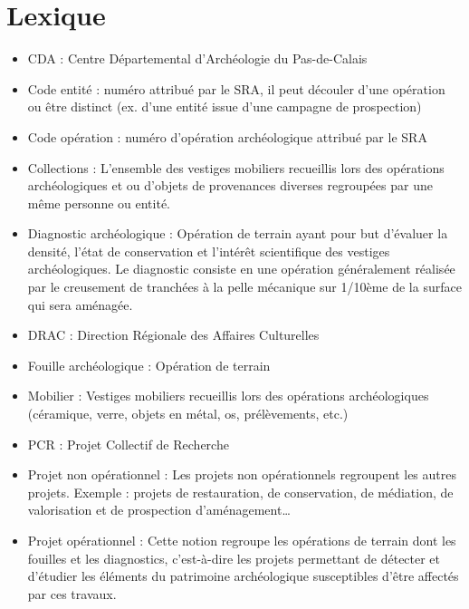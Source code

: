 \documentclass[letterpaper,10pt,french]{sphinxmanual}
\begin{document}
\chapter{Lexique}
\label{manuel/lexique:lexique}\label{manuel/lexique::doc}\begin{itemize}
\item {} 
CDA : Centre Départemental d'Archéologie du Pas-de-Calais

\item {} 
Code entité : numéro attribué par le SRA, il peut découler d'une opération ou être distinct (ex. d'une entité issue d'une campagne de prospection)

\item {} 
Code opération : numéro d’opération archéologique attribué par le SRA

\item {} 
Collections : L’ensemble des vestiges mobiliers recueillis lors des opérations archéologiques et ou d’objets de provenances diverses regroupées par une même personne ou entité.

\item {} 
Diagnostic archéologique : Opération de terrain ayant pour but d’évaluer la densité, l’état de conservation et l’intérêt scientifique des vestiges archéologiques. Le diagnostic consiste en une opération généralement réalisée par le creusement de tranchées à la pelle mécanique sur 1/10ème de la surface qui sera aménagée.

\item {} 
DRAC : Direction Régionale des Affaires Culturelles

\item {} 
Fouille archéologique : Opération de terrain

\item {} 
Mobilier : Vestiges mobiliers recueillis lors des opérations archéologiques (céramique, verre, objets en métal, os, prélèvements, etc.)

\item {} 
PCR : Projet Collectif de Recherche

\item {} 
Projet non opérationnel : Les projets non opérationnels regroupent les autres projets. Exemple : projets de restauration, de conservation, de médiation, de valorisation et de prospection d’aménagement…

\item {} 
Projet opérationnel : Cette notion regroupe les opérations de terrain dont les fouilles et les diagnostics, c’est-à-dire les projets permettant de détecter et d’étudier les éléments du patrimoine archéologique susceptibles d’être affectés par ces travaux.


\end{itemize}
\end{document}
